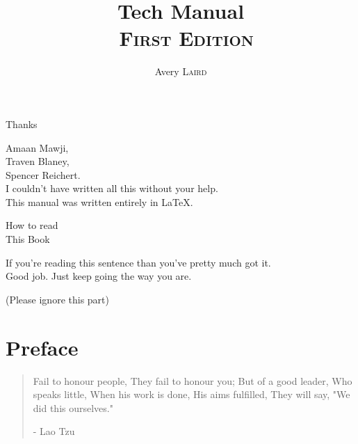 \documentclass[11pt,a4paper]{book}
\author{Avery \textsc{Laird}}
\title{\huge Tech Manual\\\
	   \textsc{\large First Edition}}
\begin{document}
\maketitle
\tableofcontents
\newpage 
\begin{center}
\Huge Thanks
\end{center}
\begin{flushleft}
\normalsize Amaan Mawji, \\ Traven Blaney, \\ Spencer Reichert. \\ I couldn't have written all this without your help. \\ This manual was written entirely in \LaTeX. \\ 
\end{flushleft}
\vspace{.3in}
\begin{center}
\huge How to read\\ This Book
\end{center}
\vspace{1in}
If you're reading this sentence than you've pretty much got it. \\ Good job. Just keep going the way you are.\\ 
\vfill
\begin{center}(Please ignore this part)\end{center} 

\normalsize

\chapter*{Preface}
\begin{flushleft}
\begin{quotation}
Fail to honour people,
They fail to honour you;
But of a good leader,
Who speaks little,
When his work is done,
His aims fulfilled,
They will say,
"We did this ourselves."


- Lao Tzu
\end{quotation}

\end{flushleft}
\end{document}

